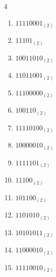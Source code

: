 \begin{multicols}{4}
\begin{enumerate}
        \phantom{$=32$}

  \item $11110001_{(2)}$

        \phantom{$=241$}

\columnbreak %

  \item $11101_{(2)}$

        \phantom{$=29$}

  \item $10011010_{(2)}$

        \phantom{$=154$}

  \item $11011001_{(2)}$

        \phantom{$=217$}

  \item $11100000_{(2)}$

        \phantom{$=224$}

  \item $100110_{(2)}$

        \phantom{$=38$}

  \item $11110100_{(2)}$

        \phantom{$=244$}

  \item $10000010_{(2)}$

        \phantom{$=130$}

  \item $1111101_{(2)}$

        \phantom{$=125$}

  \item $11100_{(2)}$

        \phantom{$=28$}

  \item $101100_{(2)}$

        \phantom{$=44$}

  \item $1101010_{(2)}$

        \phantom{$=106$}

  \item $10101011_{(2)}$

        \phantom{$=171$}

  \item $11000010_{(2)}$

        \phantom{$=194$}

  \item $11110010_{(2)}$


\end{enumerate}
\end{multicols}
